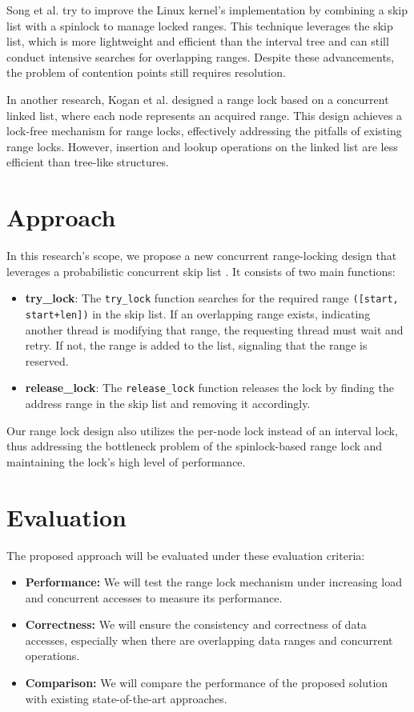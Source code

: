 Song et al. \parencite{song2013parallelizing} try to improve the Linux kernel's implementation by combining a skip list with a spinlock to manage locked ranges. This technique leverages the skip list, which is more lightweight and efficient than the interval tree and can still conduct intensive searches for overlapping ranges. Despite these advancements, the problem of contention points still requires resolution.

In another research, Kogan et al. \cite{kogan2020scalable} designed a range lock based on a concurrent linked list, where each node represents an acquired range. This design achieves a lock-free mechanism for range locks, effectively addressing the pitfalls of existing range locks. However, insertion and lookup operations on the linked list are less efficient than tree-like structures. 

\newpage

\section{Approach}
In this research's scope, we propose a new concurrent range-locking design that leverages a probabilistic concurrent skip list \parencite{herlihy2006provably, herlihy2020art}. It consists of two main functions:
\begin{itemize}
    \item \textbf{try\_lock}: The \texttt{try\_lock} function searches for the required range \texttt{([start, start+len])} in the skip list. If an overlapping range exists, indicating another thread is modifying that range, the requesting thread must wait and retry. If not, the range is added to the list, signaling that the range is reserved.
    \item \textbf{release\_lock}: The \texttt{release\_lock} function releases the lock by finding the address range in the skip list and removing it accordingly.
\end{itemize} 

Our range lock design also utilizes the per-node lock instead of an interval lock, thus addressing the bottleneck problem of the spinlock-based range lock and maintaining the lock's high level of performance. 

\section{Evaluation}
The proposed approach will be evaluated under these evaluation criteria:
\begin{itemize}
    \item \textbf{Performance:} We will test the range lock mechanism under increasing load and concurrent accesses to measure its performance.
    \item \textbf{Correctness:} We will ensure the consistency and correctness of data accesses, especially when there are overlapping data ranges and concurrent operations.
    \item \textbf{Comparison:} We will compare the performance of the proposed solution with existing state-of-the-art approaches.
\end{itemize}

